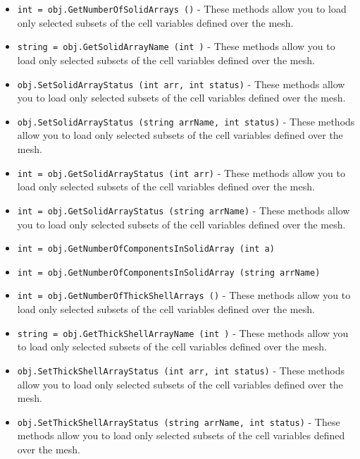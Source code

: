 \begin{itemize}
\item  \verb|int = obj.GetNumberOfSolidArrays ()| -  These methods allow you to load only selected subsets of the cell
 variables defined over the mesh.

\item  \verb|string = obj.GetSolidArrayName (int )| -  These methods allow you to load only selected subsets of the cell
 variables defined over the mesh.

\item  \verb|obj.SetSolidArrayStatus (int arr, int status)| -  These methods allow you to load only selected subsets of the cell
 variables defined over the mesh.

\item  \verb|obj.SetSolidArrayStatus (string arrName, int status)| -  These methods allow you to load only selected subsets of the cell
 variables defined over the mesh.

\item  \verb|int = obj.GetSolidArrayStatus (int arr)| -  These methods allow you to load only selected subsets of the cell
 variables defined over the mesh.

\item  \verb|int = obj.GetSolidArrayStatus (string arrName)| -  These methods allow you to load only selected subsets of the cell
 variables defined over the mesh.

\item  \verb|int = obj.GetNumberOfComponentsInSolidArray (int a)|

\item  \verb|int = obj.GetNumberOfComponentsInSolidArray (string arrName)|

\item  \verb|int = obj.GetNumberOfThickShellArrays ()| -  These methods allow you to load only selected subsets of the cell
 variables defined over the mesh.

\item  \verb|string = obj.GetThickShellArrayName (int )| -  These methods allow you to load only selected subsets of the cell
 variables defined over the mesh.

\item  \verb|obj.SetThickShellArrayStatus (int arr, int status)| -  These methods allow you to load only selected subsets of the cell
 variables defined over the mesh.

\item  \verb|obj.SetThickShellArrayStatus (string arrName, int status)| -  These methods allow you to load only selected subsets of the cell
 variables defined over the mesh.


\end{itemize}
